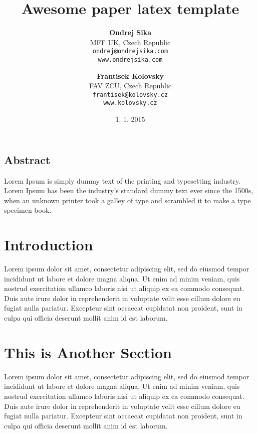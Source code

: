 \documentclass[a4paper,10pt]{article}
\title{\LARGE \bf Awesome paper latex template}
\author{
{\bf Ondrej Sika}\\
MFF UK, Czech Republic\\
\texttt{ondrej@ondrejsika.com}\\
\texttt{www.ondrejsika.com}\\
\and
{\bf Frantisek Kolovsky}\\
FAV ZCU, Czech Republic\\
\texttt{frantisek@kolovsky.cz}\\
\texttt{www.kolovsky.cz}
}
\date{1. 1. 2015}
\begin{document}
\maketitle

\subsection*{Abstract}
Lorem Ipsum is simply dummy text of the printing and typesetting industry. Lorem Ipsum has been the industry's standard dummy text ever since the 1500s, when an unknown printer took a galley of type and scrambled it to make a type specimen book.\\

\section{Introduction}
Lorem ipsum dolor sit amet, consectetur adipiscing elit, sed do eiusmod tempor incididunt ut labore et dolore magna aliqua. Ut enim ad minim veniam, quis nostrud exercitation ullamco laboris nisi ut aliquip ex ea commodo consequat. Duis aute irure dolor in reprehenderit in voluptate velit esse cillum dolore eu fugiat nulla pariatur. Excepteur sint occaecat cupidatat non proident, sunt in culpa qui officia deserunt mollit anim id est laborum.\\

\section{This is Another Section}
Lorem ipsum dolor sit amet, consectetur adipiscing elit, sed do eiusmod tempor incididunt ut labore et dolore magna aliqua. Ut enim ad minim veniam, quis nostrud exercitation ullamco laboris nisi ut aliquip ex ea commodo consequat. Duis aute irure dolor in reprehenderit in voluptate velit esse cillum dolore eu fugiat nulla pariatur. Excepteur sint occaecat cupidatat non proident, sunt in culpa qui officia deserunt mollit anim id est laborum.\\
\end{document}
